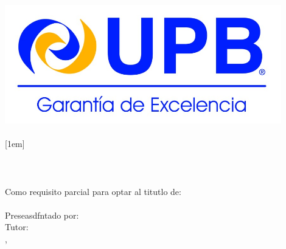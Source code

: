 
\begin{titlepage}
    \begin{center}
		\vspace{1.5cm}
		\includegraphics[width=12cm]{img/UPB.png}\\
		[1.5em]
		{\fontsize{16}{6}\selectfont{\textbf{\MakeUppercase{\university}}}}\\
		[1em]
		{\fontsize{16}{6}\selectfont{\textbf{\MakeUppercase{\faculty}}}}\\
		[1em]
		{\fontsize{16}{6}\selectfont{\textbf{\MakeUppercase{\carrer}}}}\\
		[2.2cm]
		{\fontsize{16}{6}\selectfont{\textbf{\MakeUppercase{\projectName}}}}\\
		[2.6cm]
		{\fontsize{16}{6}\selectfont{\MakeUppercase{\titulationMode}}}\\
		[2.2cm]
		\large{Como requisito parcial para optar al titutlo de:}\\
		[0.5em]
		\large{\textbf{\MakeUppercase{\degreeTitle}}}\\
		[0.5em]
		\large{Preseasdfntado por: \authorName}\\
		[0.5em]
		\large{Tutor: \tutorName}\\
		[2.2cm]
		\large{\mycity, \mydate}\\
    \end{center}
\end{titlepage}
